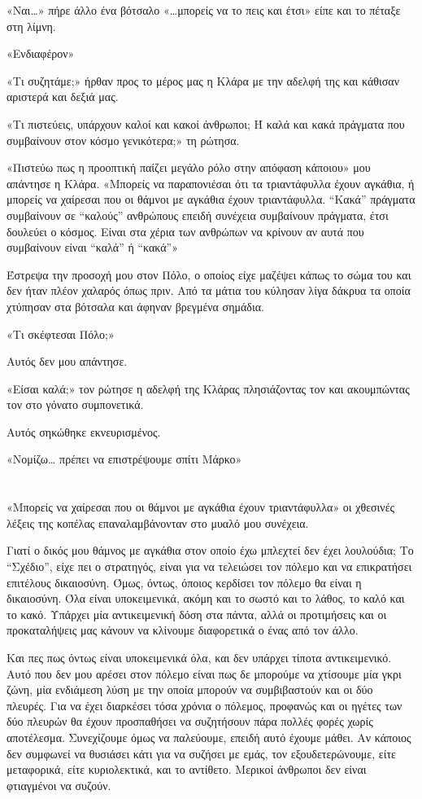\documentclass[12pt,twoside, openany]{book}
\begin{document}
«Ναι…» πήρε άλλο ένα βότσαλο «…μπορείς να το πεις και έτσι» είπε και το πέταξε στη λίμνη.

«Ενδιαφέρον»

«Τι συζητάμε;» ήρθαν προς το μέρος μας η Κλάρα με την αδελφή της και κάθισαν αριστερά και δεξιά μας.

«Τι πιστεύεις, υπάρχουν καλοί και κακοί άνθρωποι; Ή καλά και κακά πράγματα που συμβαίνουν στον κόσμο γενικότερα;» τη ρώτησα.

«Πιστεύω πως η προοπτική παίζει μεγάλο ρόλο στην απόφαση κάποιου» μου απάντησε η Κλάρα. «Μπορείς να παραπονιέσαι ότι τα τριαντάφυλλα έχουν αγκάθια, ή μπορείς να χαίρεσαι που οι θάμνοι με αγκάθια έχουν τριαντάφυλλα. “Κακά” πράγματα συμβαίνουν σε “καλούς” ανθρώπους επειδή συνέχεια συμβαίνουν πράγματα, έτσι δουλεύει ο κόσμος. Είναι στα χέρια των ανθρώπων να κρίνουν αν αυτά που συμβαίνουν είναι “καλά” ή “κακά”»

Έστρεψα την προσοχή μου στον Πόλο, ο οποίος είχε μαζέψει κάπως το σώμα του και δεν ήταν πλέον χαλαρός όπως πριν. Από τα μάτια του κύλησαν λίγα δάκρυα τα οποία χτύπησαν στα βότσαλα και άφηναν βρεγμένα σημάδια.

«Τι σκέφτεσαι Πόλο;»

Αυτός δεν μου απάντησε.

«Είσαι καλά;» τον ρώτησε η αδελφή της Κλάρας πλησιάζοντας τον και ακουμπώντας τον στο γόνατο συμπονετικά. 

Αυτός σηκώθηκε εκνευρισμένος.

«Νομίζω… πρέπει να επιστρέψουμε σπίτι Μάρκο»


\chapter{}

«Μπορείς να χαίρεσαι που οι θάμνοι με αγκάθια έχουν τριαντάφυλλα» οι χθεσινές λέξεις της κοπέλας επαναλαμβάνονταν στο μυαλό μου συνέχεια.

Γιατί ο δικός μου θάμνος με αγκάθια στον οποίο έχω μπλεχτεί δεν έχει λουλούδια; Το “Σχέδιο”, είχε πει ο στρατηγός, είναι για να τελειώσει τον πόλεμο και να επικρατήσει επιτέλους δικαιοσύνη. Όμως, όντως, όποιος κερδίσει τον πόλεμο θα είναι η δικαιοσύνη. Όλα είναι υποκειμενικά, ακόμη και το σωστό και το λάθος, το καλό και το κακό. Υπάρχει μία αντικειμενική δόση στα πάντα, αλλά οι προτιμήσεις και οι προκαταλήψεις μας κάνουν να κλίνουμε διαφορετικά ο ένας από τον άλλο.

Και πες πως όντως είναι υποκειμενικά όλα, και δεν υπάρχει τίποτα αντικειμενικό. Αυτό που δεν μου αρέσει στον πόλεμο είναι πως δε μπορούμε να χτίσουμε μία γκρι ζώνη, μία ενδιάμεση λύση με την οποία μπορούν να συμβιβαστούν και οι δύο πλευρές. Για να έχει διαρκέσει τόσα χρόνια ο πόλεμος, προφανώς και οι ηγέτες των δύο πλευρών θα έχουν προσπαθήσει να συζητήσουν πάρα πολλές φορές χωρίς αποτέλεσμα. Συνεχίζουμε όμως να παλεύουμε, επειδή αυτό έχουμε μάθει. Αν κάποιος δεν συμφωνεί να θυσιάσει κάτι για να συζήσει με εμάς, τον εξουδετερώνουμε, είτε μεταφορικά, είτε κυριολεκτικά, και το αντίθετο. Μερικοί άνθρωποι δεν είναι φτιαγμένοι να συζούν.
\end{document}
